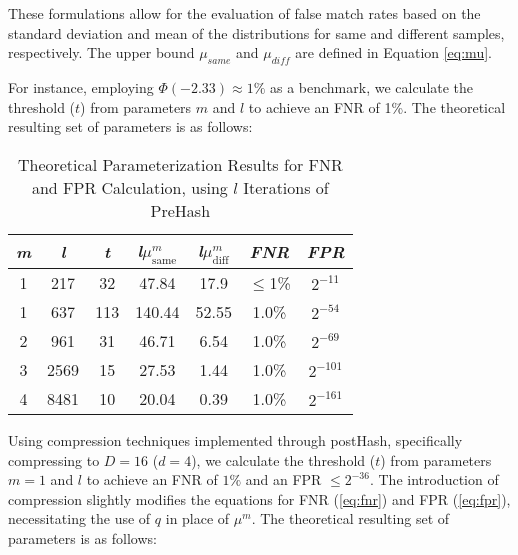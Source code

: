 
These formulations allow for the evaluation of false match rates based on the standard deviation and mean of the distributions for same and different samples, respectively. The upper bound \(\mu_{same}\) and \(\mu_{diff}\) are defined in Equation \ref{eq:mu}.

For instance, employing \(\Phi(-2.33) \approx 1\%\) as a benchmark, we calculate the threshold (\(t\)) from parameters \(m\) and \(l\) to achieve an FNR of 1\%. The theoretical resulting set of parameters is as follows: 

\begin{table}[htbp] 
    \centering
    \begin{tabular}{|c|c|c|c|c|c|c|}
        \hline
        \textit{m} & \textit{l} & \textit{t} & \textit{l}\(\mu_{\text{same}}^m\) & \textit{l}\(\mu_{\text{diff}}^m\) & \textit{FNR} & \textit{FPR} \\
        \hline
        1 & 217 & 32 & 47.84 & 17.9 & \(\leq\)1\% & \(2^{-11}\)\\
        1 & 637 & 113 & 140.44 & 52.55 & 1.0\% & \(2^{-54}\) \\
        2 & 961 & 31 & 46.71 & 6.54 & 1.0\% & \(2^{-69}\) \\
        3 & 2569 & 15 & 27.53 & 1.44 & 1.0\% &\(2^{-101}\) \\
        4 & 8481 & 10 & 20.04 & 0.39 & 1.0\% & \(2^{-161}\) \\
        \hline
    \end{tabular}
    \caption{Theoretical Parameterization Results for FNR and FPR Calculation, using $l$ Iterations of PreHash}
    \label{tab:theoretical_parameterization_PreHash}
\end{table}

Using compression techniques implemented through postHash, specifically compressing to \( D = 16 \) (\( d = 4 \)), we calculate the threshold (\( t \)) from parameters \( m = 1 \) and \( l \) to achieve an FNR of \(1\%\) and an FPR \(\leq 2^{-36} \). The introduction of compression slightly modifies the equations for FNR (\ref{eq:fnr}) and FPR (\ref{eq:fpr}), necessitating the use of \( q \) in place of \(\mu^m\). The theoretical resulting set of parameters is as follows:

